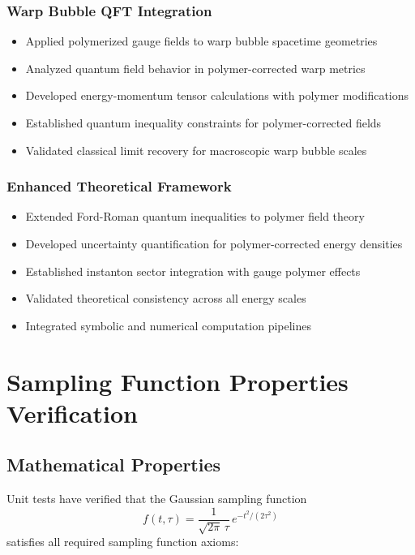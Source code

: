 \documentclass[11pt]{article}
\begin{document}
\subsubsection{Warp Bubble QFT Integration}
\begin{itemize}
    \item Applied polymerized gauge fields to warp bubble spacetime geometries
    \item Analyzed quantum field behavior in polymer-corrected warp metrics
    \item Developed energy-momentum tensor calculations with polymer modifications
    \item Established quantum inequality constraints for polymer-corrected fields
    \item Validated classical limit recovery for macroscopic warp bubble scales
\end{itemize}

\subsubsection{Enhanced Theoretical Framework}
\begin{itemize}
    \item Extended Ford-Roman quantum inequalities to polymer field theory
    \item Developed uncertainty quantification for polymer-corrected energy densities
    \item Established instanton sector integration with gauge polymer effects
    \item Validated theoretical consistency across all energy scales
    \item Integrated symbolic and numerical computation pipelines
\end{itemize}

\section{Sampling Function Properties Verification}

\subsection{Mathematical Properties}
Unit tests have verified that the Gaussian sampling function
\begin{equation}
f(t,\tau) = \frac{1}{\sqrt{2\pi}\,\tau}\,e^{-t^2/(2\tau^2)}
\end{equation}
satisfies all required sampling function axioms:
\end{document}
